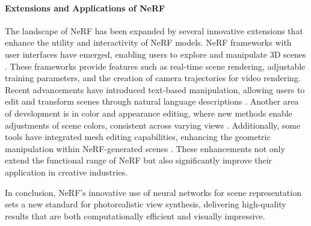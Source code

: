 \paragraph{Extensions and Applications of NeRF}
The landscape of NeRF has been expanded by several innovative extensions that enhance the utility and interactivity of NeRF models.
NeRF frameworks with user interfaces have emerged, enabling users to explore and manipulate 3D scenes \cite{muller_instant_2022,tancik_nerfstudio_2023}.
These frameworks provide features such as real-time scene rendering, adjustable training parameters, and the creation of camera trajectories for video rendering.
Recent advancements have introduced text-based manipulation, allowing users to edit and transform scenes through natural language descriptions \cite{bao_sine_2023,bar-tal_text2live_2022,haque_instruct-nerf2nerf_2023,jan-niklas_dihlmann_signerf_2024,wang_clip-nerf_2022}.
Another area of development is in color and appearance editing, where new methods enable adjustments of scene colors, consistent across varying views \cite{wu_palettenerf_2022}.
Additionally, some tools have integrated mesh editing capabilities, enhancing the geometric manipulation within NeRF-generated scenes \cite{yuan_nerf-editing_2022}.
These enhancements not only extend the functional range of NeRF but also significantly improve their application in creative industries.

In conclusion, NeRF's innovative use of neural networks for scene representation sets a new standard for photorealistic view synthesis, delivering high-quality results that are both computationally efficient and visually impressive.
